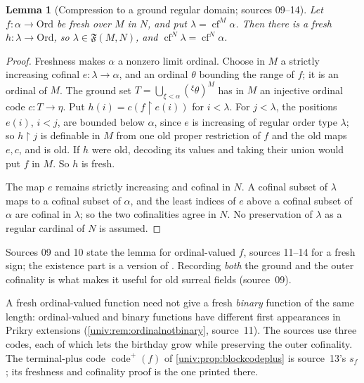 \documentclass[11pt,letterpaper]{article}
\numberwithin{equation}{section}
\newtheorem{lemma}[lemma]{Lemma}
\theoremstyle{definition}
\theoremstyle{remark}
\newcommand{\Ord}{\mathrm{Ord}}
\newcommand{\cf}{\operatorname{cf}}
\newcommand{\codeplus}{\operatorname{code}^{+}}
\newcommand{\res}{\mathbin{\upharpoonright}}
\newcommand{\FF}{\mathfrak F}
\begin{document}
\begin{lemma}[Compression to a ground regular domain; sources 09--14]\label{univ:gs:lem:compress}
Let $f:\alpha\to\Ord$ be fresh over $M$ in $N$, and put $\lambda=\cf^M\alpha$.
Then there is a fresh $h:\lambda\to\Ord$, so $\lambda\in\FF(M,N)$, and
$\cf^N\lambda=\cf^N\alpha$.
\end{lemma}
\begin{proof}
Freshness makes $\alpha$ a nonzero limit ordinal. Choose in $M$ a strictly
increasing cofinal $e:\lambda\to\alpha$, and an ordinal $\theta$ bounding the range
of $f$; it is an ordinal of $M$. The ground set
$T=\bigcup_{\xi<\alpha}({}^{\xi}\theta)^M$ has in $M$ an injective ordinal code
$c:T\to\eta$. Put $h(i)=c(f\res e(i))$ for $i<\lambda$. For $j<\lambda$, the
positions $e(i)$, $i<j$, are bounded below $\alpha$, since $e$ is increasing of
regular order type $\lambda$; so $h\res j$ is definable in $M$ from one old
proper restriction of $f$ and the old maps $e,c$, and is old. If $h$ were old,
decoding its values and taking their union would put $f$ in $M$. So $h$ is fresh.

The map $e$ remains strictly increasing and cofinal in $N$. A cofinal subset of
$\lambda$ maps to a cofinal subset of $\alpha$, and the least indices of $e$ above
a cofinal subset of $\alpha$ are cofinal in $\lambda$; so the two cofinalities
agree in $N$. No preservation of $\lambda$ as a regular cardinal of $N$ is assumed.
\end{proof}

Sources 09 and 10 state the lemma for ordinal-valued $f$, sources 11--14 for a
fresh sign; the existence part is a version of \cite[Proposition~5.2]{FKW}.
Recording \emph{both} the ground and the outer cofinality is what makes it useful
for old surreal fields (source~09).

A fresh ordinal-valued function need not give a fresh \emph{binary} function of
the same length: ordinal-valued and binary functions have different first
appearances in Prikry extensions (\cref{univ:rem:ordinalnotbinary}, source~11).
The sources use three codes, each of which lets the birthday grow while
preserving the outer cofinality. The terminal-plus code $\codeplus(f)$ of
\cref{univ:prop:blockcodeplus} is source~13's $s_f$; its freshness and cofinality
proof is the one printed there.
\end{document}

